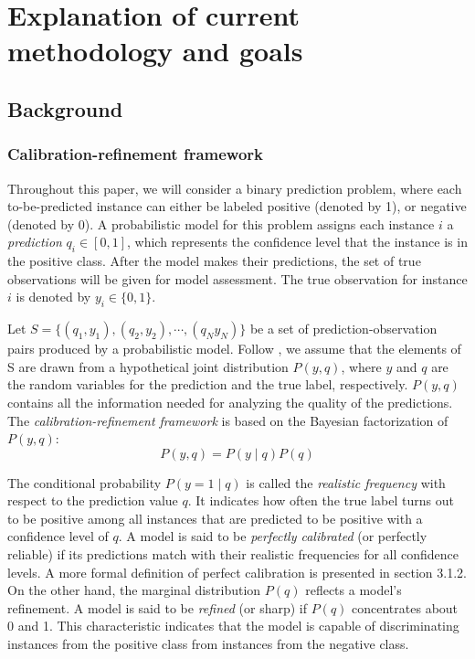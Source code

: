 \chapter{Explanation of current methodology and goals}
\section{Background}

\subsection{Calibration-refinement framework}

Throughout this paper, we will consider a binary prediction problem, where each to-be-predicted instance can either be labeled positive (denoted by 1), or negative (denoted by 0). A probabilistic model for this problem assigns each instance $i$ a \textit{prediction} $q_i \in [0, 1]$, which represents the confidence level that the instance is in the positive class. After the model makes their predictions, the set of true observations will be given for model assessment. The true observation for instance $i$ is denoted by $y_i \in \{0, 1\}$.  

Let $S = \{(q_1, y_1), (q_2, y_2), \cdots, (q_N y_N)\}$ be a set of prediction-observation pairs produced by a probabilistic model. Follow \cite{murphy1984probability}, we assume that the elements of S are drawn from a hypothetical joint distribution $P(y, q)$, where $y$ and $q$ are the random variables for the prediction and the true label, respectively. $P(y, q)$ contains all the information needed for analyzing the quality of the predictions. The \textit{calibration-refinement framework} is based on the Bayesian factorization of $P(y, q)$:
\begin{equation}
  P(y, q) = P(y \mid q)P(q)
  \label{eqn:calib-ref-factor}
\end{equation}

The conditional probability $P(y = 1 \mid q)$ is called the \textit{realistic frequency} with respect to the prediction value $q$. It indicates how often the true label turns out to be positive among all instances that are predicted to be positive with a confidence level of $q$. A model is said to be \textit{perfectly calibrated} (or perfectly reliable) if its predictions match with their realistic frequencies for all confidence levels. A more formal definition of perfect calibration is presented in section 3.1.2. On the other hand, the marginal distribution $P(q)$ reflects a model's refinement. A model is said to be \textit{refined} (or sharp) if $P(q)$ concentrates about 0 and 1. This characteristic indicates that the model is capable of discriminating instances from the positive class from instances from the negative class.   


